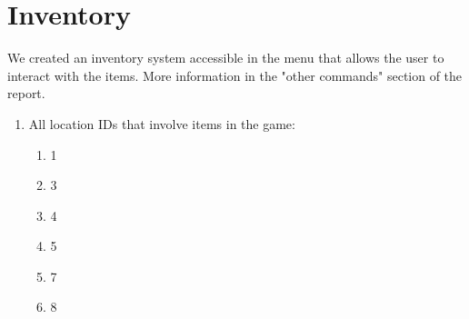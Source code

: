 \documentclass[11pt]{article}
\begin{document}
\section*{Inventory}
We created an inventory system accessible in the menu that allows the user to interact with the items. More information in the "other commands" section of the report.
\begin{enumerate}
\item All location IDs that involve items in the game:
\begin{enumerate}
    \item 1
    \item 3
    \item 4
    \item 5
    \item 7
    \item 8
\end{enumerate}


\end{enumerate}
\end{document}
